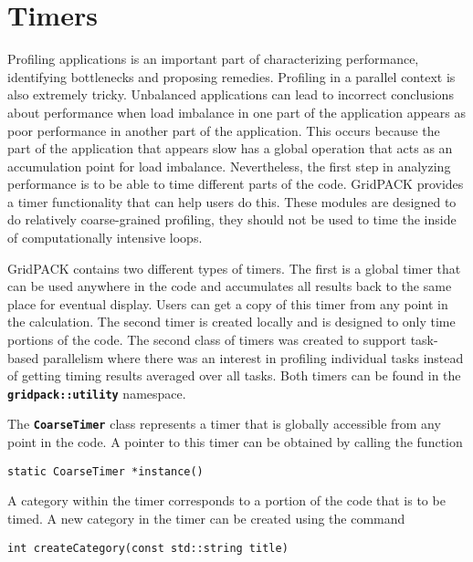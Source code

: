 \section{Timers}

Profiling applications is an important part of characterizing performance, identifying bottlenecks and proposing remedies. Profiling in a parallel context is also extremely tricky. Unbalanced applications can lead to incorrect conclusions about performance when load imbalance in one part of the application appears as poor performance in another part of the application. This occurs because the part of the application that appears slow has a global operation that acts as an accumulation point for load imbalance. Nevertheless, the first step in analyzing performance is to be able to time different parts of the code. GridPACK provides a timer functionality that can help users do this. These modules are designed to do relatively coarse-grained profiling, they should not be used to time the inside of computationally intensive loops.

GridPACK contains two different types of timers. The first is a global timer
that can be used anywhere in the code and accumulates all results back to the
same place for eventual display. Users can get a copy of this timer from any
point in the calculation. The second timer is created locally and is designed to
only time portions of the code. The second class of timers was created to
support task-based parallelism where there was an interest in profiling individual tasks instead of getting timing results averaged over all tasks. Both timers can be found in the \texttt{\textbf{gridpack::utility}} namespace.

The \texttt{\textbf{CoarseTimer}} class represents a timer that is globally accessible from any point in the code. A pointer to this timer can be obtained by calling the function

{
\color{red}
\begin{Verbatim}[fontseries=b]
static CoarseTimer *instance()
\end{Verbatim}
}

A category within the timer corresponds to a portion of the code that is to be timed. A new category in the timer can be created using the command

{
\color{red}
\begin{Verbatim}[fontseries=b]
int createCategory(const std::string title)
\end{Verbatim}
}

